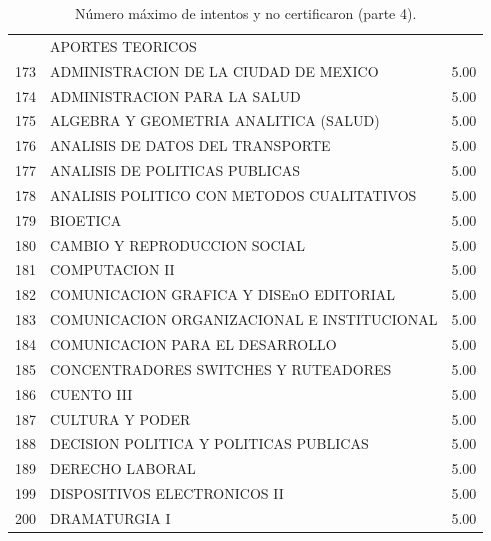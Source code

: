 \documentclass[12pt]{article}
\begin{document}
\begin{table}[ht]
{\begin{tabular}{rlr}
   &  APORTES TEORICOS &  \\ 
  173 & ADMINISTRACION DE LA CIUDAD DE MEXICO & 5.00 \\ 
  174 & ADMINISTRACION PARA LA SALUD & 5.00 \\ 
  175 & ALGEBRA Y GEOMETRIA ANALITICA (SALUD) & 5.00 \\ 
  176 & ANALISIS DE DATOS DEL TRANSPORTE & 5.00 \\ 
  177 & ANALISIS DE POLITICAS PUBLICAS & 5.00 \\ 
  178 & ANALISIS POLITICO CON METODOS CUALITATIVOS & 5.00 \\ 
  179 & BIOETICA & 5.00 \\ 
  180 & CAMBIO Y REPRODUCCION SOCIAL & 5.00 \\ 
  181 & COMPUTACION II & 5.00 \\ 
  182 & COMUNICACION GRAFICA Y DISEnO EDITORIAL & 5.00 \\ 
  183 & COMUNICACION ORGANIZACIONAL E INSTITUCIONAL & 5.00 \\ 
  184 & COMUNICACION PARA EL DESARROLLO & 5.00 \\ 
  185 & CONCENTRADORES SWITCHES Y RUTEADORES & 5.00 \\ 
  186 & CUENTO III & 5.00 \\ 
  187 & CULTURA Y PODER & 5.00 \\ 
  188 & DECISION POLITICA Y POLITICAS PUBLICAS & 5.00 \\ 
  189 & DERECHO LABORAL & 5.00 \\ 
  199 & DISPOSITIVOS ELECTRONICOS II & 5.00 \\ 
  200 & DRAMATURGIA I & 5.00 \\ 

   \hline
\end{tabular}
}\caption{\label{Num_Max_Intentos_Nunca_Cert_4} N\'umero m\'aximo de intentos y no certificaron (parte 4).}

\end{table}
\end{document}
